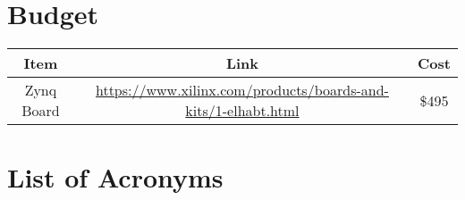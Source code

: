 \documentclass[11pt, oneside]{article}   	%
\begin{document}
\section{Budget}

\begin{center}
\begin{tabular}{ |c|c|c|}
    \hline
    \textbf{Item}           & \textbf{Link}                                                     & \textbf{Cost} \\
    \hline
    Zynq Board              & \href{https://www.xilinx.com/products/boards-and-kits/1-elhabt.html}{https://www.xilinx.com/products/boards-and-kits/1-elhabt.html}     & \$495 \\
    \hline
\end{tabular}
\end{center}

\section{List of Acronyms}


\clearpage  %
\end{document}
